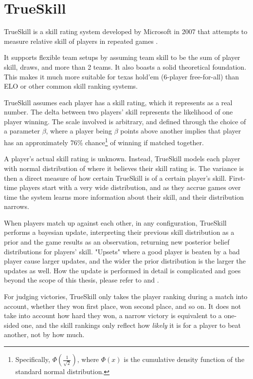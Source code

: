 \section{TrueSkill}

TrueSkill is a skill rating system developed by Microsoft in 2007 that attempts to measure relative skill of players in repeated games \cite{TrueSkill_original} \cite{TrueSkill_blog}.

It supports flexible team setups by assuming team skill to be the sum of player skill, draws, and more than 2 teams. It also boasts a solid theoretical foundation. This makes it much more suitable for texas hold'em (6-player free-for-all) than ELO  or other common skill ranking systems.

TrueSkill assumes each player has a skill rating, which it represents as a real number. The delta between two players' skill represents the likelihood of one player winning. The scale involved is arbitrary, and defined through the choice of a parameter $\beta$, where a player being $\beta$ points above another implies that player has an approximately 76\% chance\footnote{Specifically, $\Phi\left(\frac{1}{\sqrt{2}}\right)$, where $\Phi(x)$ is the cumulative density function of the standard normal distribution.} of winning if matched together.

A player's actual skill rating is unknown. Instead, TrueSkill models each player with normal distribution of where it believes their skill rating is. The variance is then a direct measure of how certain TrueSkill is of a certain player's skill. First-time players start with a very wide distribution, and as they accrue games over time the system learns more information about their skill, and their distribution narrows.

When players match up against each other, in any configuration, TrueSkill performs a bayesian update, interpreting their previous skill distribution as a prior and the game results as an observation, returning new posterior belief distributions for players' skill. "Upsets" where a good player is beaten by a bad player cause larger updates, and the wider the prior distribution is the larger the updates as well. How the update is performed in detail is complicated and goes beyond the scope of this thesis, please refer to \cite{TrueSkill_original} and \cite{TrueSkill_blog}.

For judging victories, TrueSkill only takes the player ranking during a match into account, whether they won first place, won second place, and so on. It does not take into account how hard they won, a narrow victory is equivalent to a one-sided one, and the skill rankings only reflect how \textit{likely} it is for a player to beat another, not by how much.

